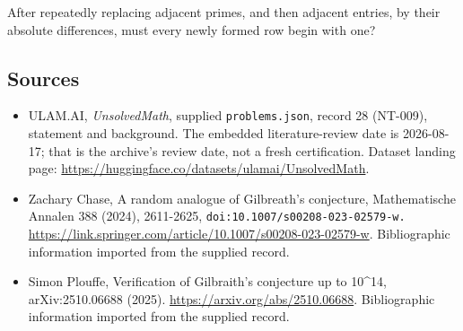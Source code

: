 \documentclass[11pt,a4paper]{article}
\begin{document}
After repeatedly replacing adjacent primes, and then adjacent entries, by their absolute differences, must every newly formed row begin with one?

\subsection{Sources}

{\small

\begin{itemize}

\item[\hypertarget{source:28:1}{S1}] ULAM.AI, \emph{UnsolvedMath}, supplied \texttt{problems.json}, record 28 (NT-009), statement and background. The embedded literature-review date is 2026-08-17; that is the archive’s review date, not a fresh certification. Dataset landing page: \url{https://huggingface.co/datasets/ulamai/UnsolvedMath}.

\item[\hypertarget{source:28:2}{S2}] Zachary Chase, A random analogue of Gilbreath's conjecture, Mathematische Annalen 388 (2024), 2611-2625, \nolinkurl{doi:10.1007/s00208-023-02579-w.} \url{https://link.springer.com/article/10.1007/s00208-023-02579-w}. Bibliographic information imported from the supplied record.

\item[\hypertarget{source:28:3}{S3}] Simon Plouffe, Verification of Gilbraith's conjecture up to 10\textasciicircum{}14, arXiv:2510.06688 (2025). \url{https://arxiv.org/abs/2510.06688}. Bibliographic information imported from the supplied record.

\end{itemize}

}

\label{end:28}
\end{document}

